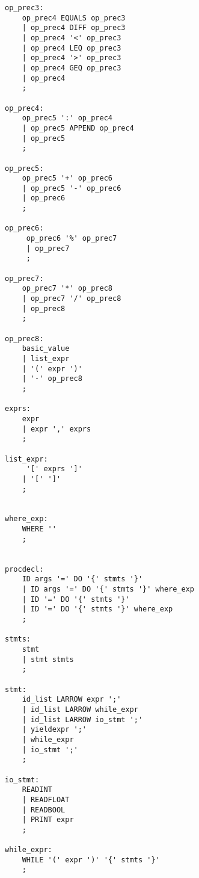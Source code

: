 \documentclass[11pt]{article}
\begin{document}
\begin{lstlisting}[basicstyle=\small]
op_prec3:
    op_prec4 EQUALS op_prec3 
    | op_prec4 DIFF op_prec3 
    | op_prec4 '<' op_prec3 
    | op_prec4 LEQ op_prec3 
    | op_prec4 '>' op_prec3 
    | op_prec4 GEQ op_prec3 
    | op_prec4 
	;

op_prec4:
    op_prec5 ':' op_prec4 
    | op_prec5 APPEND op_prec4 
    | op_prec5 
	;

op_prec5:
    op_prec5 '+' op_prec6 
    | op_prec5 '-' op_prec6 
    | op_prec6 
	;

op_prec6:
     op_prec6 '%' op_prec7
     | op_prec7 
	 ;

op_prec7:
    op_prec7 '*' op_prec8
    | op_prec7 '/' op_prec8
    | op_prec8 
	;

op_prec8:
    basic_value 
    | list_expr 
    | '(' expr ')' 
    | '-' op_prec8 
	;

exprs:
    expr 
    | expr ',' exprs 
	;

list_expr:
     '[' exprs ']' 
    | '[' ']' 
	;


where_exp:
    WHERE ''  
	;


procdecl:
    ID args '=' DO '{' stmts '}' 
    | ID args '=' DO '{' stmts '}' where_exp 
    | ID '=' DO '{' stmts '}' 
    | ID '=' DO '{' stmts '}' where_exp  
	;

stmts:
    stmt 
    | stmt stmts 
	;

stmt:
    id_list LARROW expr ';' 
    | id_list LARROW while_expr 
    | id_list LARROW io_stmt ';'
    | yieldexpr ';'
    | while_expr 
    | io_stmt ';' 
	;

io_stmt:
    READINT     
    | READFLOAT 
    | READBOOL 
    | PRINT expr 
	;

while_expr:
    WHILE '(' expr ')' '{' stmts '}' 
	;
\end{lstlisting}
\end{document}
